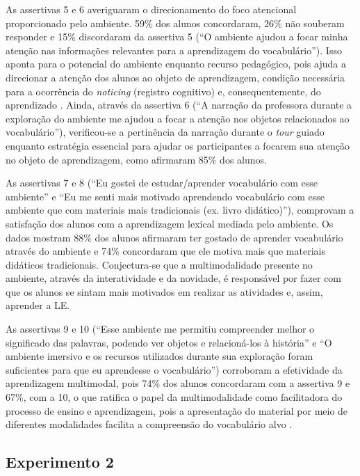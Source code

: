 As assertivas 5 e 6 averiguaram o direcionamento do foco atencional
proporcionado pelo ambiente. 59\% dos alunos concordaram, 26\% não
souberam responder e 15\% discordaram da assertiva 5 (``O ambiente
ajudou a focar minha atenção nas informações relevantes para a
aprendizagem do vocabulário''). Isso aponta para o potencial do ambiente
enquanto recurso pedagógico, pois ajuda a direcionar a atenção dos
alunos ao objeto de aprendizagem, condição necessária para a ocorrência
do \emph{noticing} (registro cognitivo) e, consequentemente, do
aprendizado \cite{schmidit1990}. Ainda, através da assertiva 6 (``A narração
da professora durante a exploração do ambiente me ajudou a focar a
atenção nos objetos relacionados ao vocabulário''), verificou-se a
pertinência da narração durante o \emph{tour} guiado enquanto estratégia
essencial para ajudar os participantes a focarem sua atenção no objeto
de aprendizagem, como afirmaram 85\% dos alunos.

As assertivas 7 e 8 (``Eu gostei de estudar/aprender vocabulário com
esse ambiente'' e ``Eu me senti mais motivado aprendendo vocabulário com
esse ambiente que com materiais mais tradicionais (ex. livro
didático)''), comprovam a satisfação dos alunos com a aprendizagem
lexical mediada pelo ambiente. Os dados mostram 88\% dos alunos
afirmaram ter gostado de aprender vocabulário através do ambiente e 74\%
concordaram que ele motiva mais que materiais didáticos tradicionais.
Conjectura-se que a multimodalidade presente no ambiente, através da
interatividade e da novidade, é responsável por fazer com que os alunos
se sintam mais motivados em realizar as atividades e, assim, aprender a
LE.

As assertivas 9 e 10 (``Esse ambiente me permitiu compreender melhor o
significado das palavras, podendo ver objetos e relacioná-los à
história'' e ``O ambiente imersivo e os recursos utilizados durante sua
exploração foram suficientes para que eu aprendesse o vocabulário'')
corroboram a efetividade da aprendizagem multimodal, pois 74\% dos
alunos concordaram com a assertiva 9 e 67\%, com a 10, o que ratifica o
papel da multimodalidade como facilitadora do processo de ensino e
aprendizagem, pois a apresentação do material por meio de diferentes
modalidades facilita a compreensão do vocabulário alvo \cite{mayer2001}.

\subsection{Experimento 2}\label{sub-sec-experimento2}

